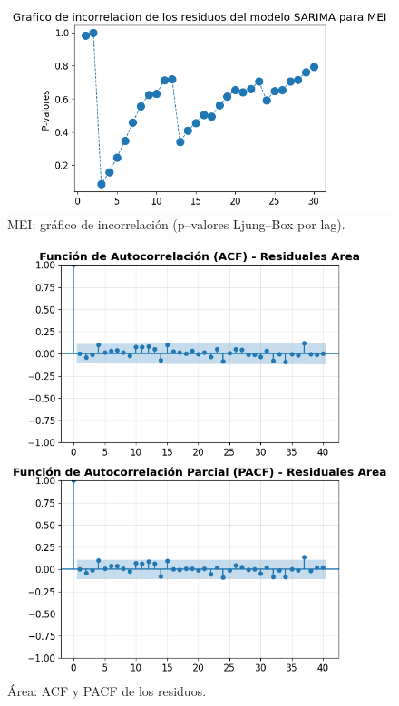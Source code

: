 \begin{figure}[H]\centering
\includegraphics[scale=.52]{Figures/inco_mei.png}
\caption{MEI: gráfico de incorrelación (p--valores Ljung--Box por lag).}
\label{fig:inco_mei}
\end{figure}

\begin{figure}[H]\centering
\includegraphics[scale=.52]{Figures/acf_pacf_res_area.png}
\caption{Área: ACF y PACF de los residuos.}
\label{fig:acf_pacf_res_area}
\end{figure}

